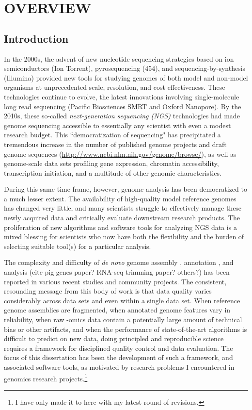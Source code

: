 \chapter{OVERVIEW}

\section{Introduction}

In the 2000s, the advent of new nucleotide sequencing strategies based on ion semiconductors (Ion Torrent), pyrosequencing (454), and sequencing-by-synthesis (Illumina) provided new tools for studying genomes of both model and non-model organisms at unprecedented scale, resolution, and cost effectiveness.
These technologies continue to evolve, the latest innovations involving single-molecule long read sequencing (Pacific Biosciences SMRT and Oxford Nanopore).
By the 2010s, these so-called \textit{next-generation sequencing (NGS)} technologies had made genome sequencing accessible to essentially any scientist with even a modest research budget.
This ``democratization of sequencing" has precipitated a tremendous increase in the number of published genome projects and draft genome sequences (\url{http://www.ncbi.nlm.nih.gov/genome/browse/}), as well as genome-scale data sets profiling gene expression, chromatin accessibility, transcription initiation, and a multitude of other genomic characteristics.

During this same time frame, however, genome analysis has been democratized to a much lesser extent.
The availability of high-quality model reference genomes has changed very little, and many scientists struggle to effectively manage these newly acquired data and critically evaluate downstream research products.
The proliferation of new algorithms and software tools for analyzing NGS data is a mixed blessing for scientists who now have both the flexibility and the burden of selecting suitable tool(s) for a particular analysis.

The complexity and difficulty of \textit{de novo} genome assembly \cite{Assemblathon1,Assemblathon2,GAGE,QUAST}, annotation \cite{EGASP,Eilbeck,DentonFly}, and analysis (cite pig genes paper? RNA-seq trimming paper? others?) has been reported in various recent studies and community projects.
The consistent, resounding message from this body of work is that data quality varies considerably across data sets and even within a single data set.
When reference genome assemblies are fragmented, when annotated genome features vary in reliability, when raw -omics data contain a potentially large amount of technical bias or other artifacts, and when the performance of state-of-the-art algorithms is difficult to predict on new data, doing principled and reproducible science requires a framework for disciplined quality control and data evaluation.
The focus of this dissertation has been the development of such a framework, and associated software tools, as motivated by research problems I encountered in genomics research projects.\footnote{I have only made it to here with my latest round of revisions.}

